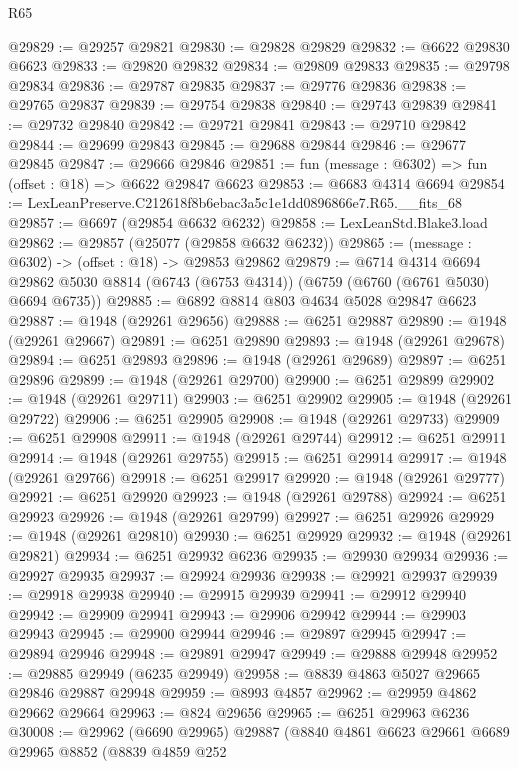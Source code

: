 \begin{lexlean}{R65}
\begin{coremodule}
{@29829 := @29257 @29821
@29830 := @29828 @29829
@29832 := @6622 @29830 @6623
@29833 := @29820 @29832
@29834 := @29809 @29833
@29835 := @29798 @29834
@29836 := @29787 @29835
@29837 := @29776 @29836
@29838 := @29765 @29837
@29839 := @29754 @29838
@29840 := @29743 @29839
@29841 := @29732 @29840
@29842 := @29721 @29841
@29843 := @29710 @29842
@29844 := @29699 @29843
@29845 := @29688 @29844
@29846 := @29677 @29845
@29847 := @29666 @29846
@29851 := fun (message : @6302) => fun (offset : @18) => @6622 @29847 @6623
@29853 := @6683 @4314 @6694
@29854 := LexLeanPreserve.C212618f8b6ebac3a5c1e1dd0896866e7.R65.__fits_68
@29857 := @6697 (@29854 @6632 @6232)
@29858 := LexLeanStd.Blake3.load
@29862 := @29857 (@25077 (@29858 @6632 @6232))
@29865 := (message : @6302) -> (offset : @18) -> @29853 @29862
@29879 := @6714
    @4314
    @6694
    @29862
    @5030
    @8814
    (@6743 (@6753 @4314))
    (@6759 (@6760 (@6761 @5030) @6694 @6735))
@29885 := @6892 @8814 @803 @4634 @5028 @29847 @6623
@29887 := @1948 (@29261 @29656)
@29888 := @6251 @29887
@29890 := @1948 (@29261 @29667)
@29891 := @6251 @29890
@29893 := @1948 (@29261 @29678)
@29894 := @6251 @29893
@29896 := @1948 (@29261 @29689)
@29897 := @6251 @29896
@29899 := @1948 (@29261 @29700)
@29900 := @6251 @29899
@29902 := @1948 (@29261 @29711)
@29903 := @6251 @29902
@29905 := @1948 (@29261 @29722)
@29906 := @6251 @29905
@29908 := @1948 (@29261 @29733)
@29909 := @6251 @29908
@29911 := @1948 (@29261 @29744)
@29912 := @6251 @29911
@29914 := @1948 (@29261 @29755)
@29915 := @6251 @29914
@29917 := @1948 (@29261 @29766)
@29918 := @6251 @29917
@29920 := @1948 (@29261 @29777)
@29921 := @6251 @29920
@29923 := @1948 (@29261 @29788)
@29924 := @6251 @29923
@29926 := @1948 (@29261 @29799)
@29927 := @6251 @29926
@29929 := @1948 (@29261 @29810)
@29930 := @6251 @29929
@29932 := @1948 (@29261 @29821)
@29934 := @6251 @29932 @6236
@29935 := @29930 @29934
@29936 := @29927 @29935
@29937 := @29924 @29936
@29938 := @29921 @29937
@29939 := @29918 @29938
@29940 := @29915 @29939
@29941 := @29912 @29940
@29942 := @29909 @29941
@29943 := @29906 @29942
@29944 := @29903 @29943
@29945 := @29900 @29944
@29946 := @29897 @29945
@29947 := @29894 @29946
@29948 := @29891 @29947
@29949 := @29888 @29948
@29952 := @29885 @29949 (@6235 @29949)
@29958 := @8839 @4863 @5027 @29665 @29846 @29887 @29948
@29959 := @8993 @4857
@29962 := @29959 @4862 @29662 @29664
@29963 := @824 @29656
@29965 := @6251 @29963 @6236
@30008 := @29962
    (@6690 @29965)
    @29887
    (@8840
      @4861
      @6623
      @29661
      @6689
      @29965
      @8852
      (@8839
        @4859
        @252
}
\end{coremodule}
\end{lexlean}

